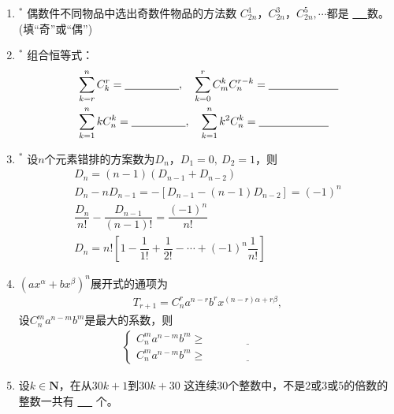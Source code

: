 \documentclass{article}
\newif\ifte
\newcommand{\q}{\quad}
\renewcommand\geq\geqslant
\begin{document}
\begin{multicols}{2}
\begin{enumerate}[leftmargin=20pt]
\item $^*$ 偶数件不同物品中选出奇数件物品的方法数
$ C_{2n}^1 $，$ C_{2n}^3 $，$ C_{2n}^5,\cdots $都是
\underline{\ \ifte 偶\else \hspace{0.5 cm} \fi\ }数。
(填“奇”或“偶”)

\item $^*$ 组合恒等式：
\begin{align*}
&\sum_{k=r}^{n} C_k^r=\underline{\ \ifte C_{n+1}^{r+1}
     \else \hspace{1.5cm} \fi\ },\q
\sum_{k=0}^{r}C_m^kC_n^{r-k}=\underline{\ \ifte 
    C_{n+m}^r \else \hspace{2cm} \fi\ }  \\
&\sum_{k=1}^{n} kC_n^k=\underline{\ \ifte n\cdot2^{n-1} 
     \else \hspace{1.5cm} \fi\ },\q 
\sum_{k=1}^{n} k^2C_n^k=\underline{\ \ifte 
    n(n+1)\cdot2^{n-2} \else \hspace{2cm} \fi\ } 
\end{align*}

\item $^*$ 设$ n $个元素错排的方案数为$ D_n $，$ D_1=0,\ D_2=1 $，则
\begin{gather*}
    D_n =(n-1)(D_{n-1}+D_{n-2}) \\
    D_n-nD_{n-1}=-[D_{n-1}-(n-1)D_{n-2}]=(-1)^n \\
    \dfrac{D_n}{n!}-\dfrac{D_{n-1}}{(n-1)!}=\dfrac{(-1)^n}{n!} \\
    D_n= n!\left[ 1-\dfrac{1}{1!}+\dfrac{1}{2!}-\cdots 
    +(-1)^n\dfrac{1}{n!}\right]
\end{gather*}

\item $ \left(ax^{\alpha}+bx^{\beta} \right)^n $展开式的通项为
\begin{gather*}
    T_{r+1}=C_n^ra^{n-r}b^rx^{(n-r)\alpha+r\beta} ,
\end{gather*}
设$ C_n^m a^{n-m}b^m $是最大的系数，则
\begin{align*}
\begin{cases}
    C_n^m a^{n-m}b^m\geq \underline{\ \ifte 
      C_n^{m-1} a^{n-m+1}b^{m-1} \else \hspace{3cm} \fi\ } \\
    C_n^m a^{n-m}b^m\geq \underline{\ \ifte 
      C_n^{m+1} a^{n-m-1}b^{m+1}\else \hspace{3cm} \fi\ }
\end{cases}
\end{align*} 

\item 设$ k\in \mathbf{N} $，在从$ 30k+1 $到$ 30k+30 $
这连续30个整数中，不是2或3或5的倍数的整数一共有
\underline{\ \ifte 8 \else \hspace{0.5 cm} \fi\ } 个。


\end{enumerate}
\end{multicols}
\end{document}
